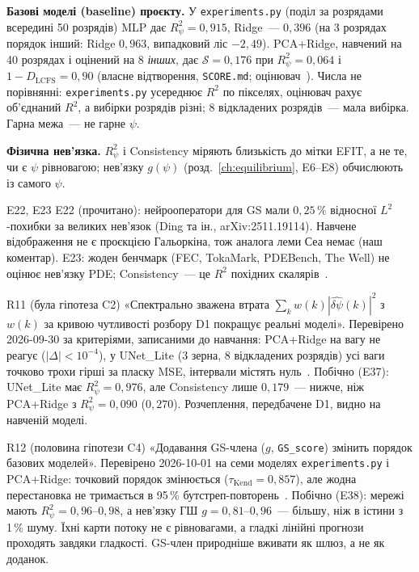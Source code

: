 \textbf{Базові моделі (baseline) проєкту.} У \texttt{experiments.py} (поділ за розрядами всередині 50 розрядів) MLP дає $R^2_\psi=0{,}915$, Ridge~--- $0{,}396$ (на 3 розрядах порядок інший: Ridge $0{,}963$, випадковий ліс $-2{,}49$). PCA+Ridge, навчений на 40 розрядах і оцінений на 8 \emph{інших}, дає $\mathcal S=0{,}176$ при $R^2_\psi=0{,}064$ і $1-D_{\mathrm{LCFS}}=0{,}90$ (власне відтворення, \texttt{SCORE.md}; оцінювач~\cite{FEC2026}). Числа не порівнянні: \texttt{experiments.py} усереднює $R^2$ по пікселях, оцінювач рахує об'єднаний $R^2$, а вибірки розрядів різні; 8 відкладених розрядів~--- мала вибірка. Гарна межа~--- не гарне $\psi$.

\textbf{Фізична нев'язка.} $R^2_\psi$ і Consistency міряють близькість до мітки EFIT, а не те, чи є $\psi$ рівновагою; нев'язку $g(\psi)$ (розд.~\ref{ch:equilibrium}, E6--E8) обчислюють із самого $\psi$.
\begin{established}{E22, E23}
E22 (прочитано): нейрооператори для GS мали $0{,}25\,\%$ відносної $L^2$-похибки за великих нев'язок (Ding та ін., arXiv:2511.19114). Навчене відображення не є проєкцією Гальоркіна, тож аналога леми Сеа немає (наш коментар). E23: жоден бенчмарк (FEC, TokaMark, PDEBench, The Well) не оцінює нев'язку PDE; Consistency~--- це $R^2$ похідних скалярів~\cite{ProjRegisters}.
\end{established}

\begin{refuted}{R11 (була гіпотеза C2)}
«Спектрально зважена втрата $\sum_k w(k)|\widehat{\delta\psi}(k)|^2$ з $w(k)$ за кривою чутливості розбору D1 покращує реальні моделі». Перевірено 2026-09-30 за критеріями, записаними до навчання: PCA+Ridge на вагу не реагує ($|\Delta|<10^{-4}$), у UNet\_Lite (3 зерна, 8 відкладених розрядів) усі ваги точково трохи гірші за пласку MSE, інтервали містять нуль~\cite{ProjRegisters,ProjGuide}. Побічно (E37): UNet\_Lite має $R^2_\psi=0{,}976$, але Consistency лише $0{,}179$~--- нижче, ніж PCA+Ridge з $R^2_\psi=0{,}090$ ($0{,}270$). Розчеплення, передбачене D1, видно на навченій моделі.
\end{refuted}

\begin{refuted}{R12 (половина гіпотези C4)}
«Додавання GS-члена ($g$, \texttt{GS\_score}) змінить порядок базових моделей». Перевірено 2026-10-01 на семи моделях \texttt{experiments.py} і PCA+Ridge: точковий порядок змінюється ($\tau_{\mathrm{Kend}}=0{,}857$), але жодна перестановка не тримається в 95\,\% бутстреп-повторень~\cite{ProjRegisters,ProjGuide}. Побічно (E38): мережі мають $R^2_\psi=0{,}96$--$0{,}98$, а нев'язку ГШ $g=0{,}81$--$0{,}96$~--- більшу, ніж в істини з 1\,\% шуму. Їхні карти потоку не є рівновагами, а гладкі лінійні прогнози проходять завдяки гладкості. GS-член природніше вживати як шлюз, а не як доданок.
\end{refuted}

